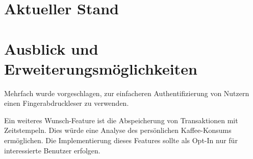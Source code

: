 \documentclass[11pt,a4paper]{IEEEtran} \usepackage[ngerman]{babel}
\begin{document}
\section{Aktueller Stand}

\section{Ausblick und Erweiterungsmöglichkeiten}

Mehrfach wurde vorgeschlagen, zur einfacheren Authentifizierung von Nutzern
einen Fingerabdruckleser zu verwenden. 

Ein weiteres Wunsch-Feature ist die Abspeicherung von Transaktionen mit
Zeitstempeln. Dies würde eine Analyse des persönlichen Kaffee-Konsums
ermöglichen. Die Implementierung dieses Features sollte als Opt-In nur für
interessierte Benutzer erfolgen. 

\printbibliography
\end{document}
